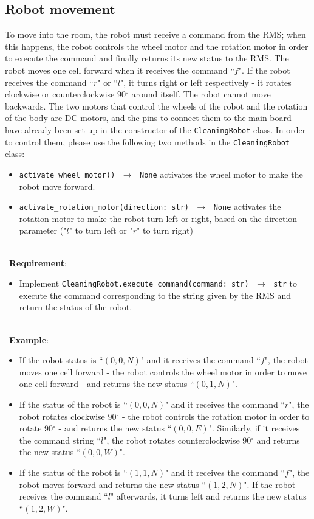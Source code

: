 \subsection{Robot movement}
To move into the room, the robot must receive a command from the RMS; when this happens, the robot controls the wheel motor and the rotation motor in order to execute the command and finally returns its new status to the RMS.
The robot moves one cell forward when it receives the command ``$f$". If the robot receives the command ``$r$" or ``$l$", it turns right or left respectively - \ie it rotates clockwise or counterclockwise 90$^{\circ}$ around itself. The robot cannot move backwards.
The two motors that control the wheels of the robot and the rotation of the body are DC motors, and the pins to connect them to the main board have already been set up in the constructor of the \texttt{CleaningRobot} class.
In order to control them, please use the following two methods in the \texttt{CleaningRobot} class:
\begin{itemize}
    \item \texttt{activate\_wheel\_motor() $\,\to\,$ None}  activates the wheel motor to make the robot move forward.
    \item \texttt{activate\_rotation\_motor(direction: str) $\,\to\,$ None} activates the rotation motor to make the robot turn left or right, based on the direction parameter ("$l$" to turn left or "$r$" to turn right)
\end{itemize}

\ \\ \
\noindent\textbf{Requirement}:
\begin{itemize}
    \item Implement \texttt{CleaningRobot.execute\_command(command: str) $\,\to\,$ str} to execute the command corresponding to the string given by the RMS and return the status of the robot.
\end{itemize}

\ \\ \
\noindent\textbf{Example}:
\begin{itemize}
    \item If the robot status is ``$(0,0,N)$" and it receives the command ``$f$", the robot moves one cell forward - \ie the robot controls the wheel motor in order to move one cell forward - and returns the new status ``$(0,1,N)$". 
    \item If the status of the robot is ``$(0,0,N)$" and it receives the command ``$r$", the robot rotates clockwise 90$^{\circ}$ - \ie the robot controls the rotation motor in order to rotate 90$^{\circ}$ - and returns the new status ``$(0,0,E)$". Similarly, if it receives the command string ``$l$", the robot rotates counterclockwise 90$^{\circ}$ and returns the new status ``$(0,0,W)$".
    \item If the  status of the robot is ``$(1,1,N)$" and it receives the command ``$f$", the robot moves forward and returns the new status ``$(1,2,N)$". If the robot receives the command ``$l$" afterwards, it turns left and returns the new status ``$(1,2,W)$".
\end{itemize}

